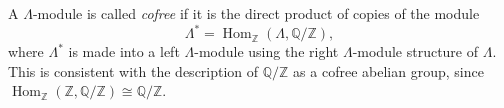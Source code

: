 A $\Lambda$-module is called \emph{cofree} if it is the direct product of copies of the module
$$\Lambda^{*} = \operatorname{Hom}_{\mathbb{Z}}(\Lambda, \mathbb{Q}/\mathbb{Z}),$$
where $\Lambda^{*}$ is made into a left $\Lambda$-module using the right $\Lambda$-module structure of $\Lambda$. This is consistent with the description of $\mathbb{Q}/\mathbb{Z}$ as a cofree abelian group, since $\operatorname{Hom}_{\mathbb{Z}}(\mathbb{Z}, \mathbb{Q}/\mathbb{Z}) \cong \mathbb{Q}/\mathbb{Z}$.
